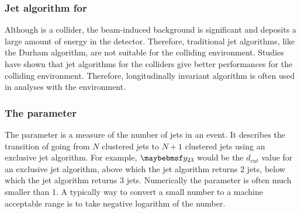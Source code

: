 \subsubsection{Jet algorithm for \CLIC}

Although \CLIC is a \ee collider, the  beam-induced background is significant and deposits a large amount of energy in the detector. Therefore, traditional \ee jet algorithms, like the Durham algorithm, are not suitable for the \CLIC colliding environment. Studies \cite{Linssen:2012hp,LCD-Note-2010-006} have shown that jet algorithms for the \pp colliders give better performances for the \CLIC  colliding environment. Therefore, longitudinally invariant \kt algorithm is often used in analyses with the \CLIC environment.





\subsubsection{The \y{} parameter}
\label{sec:pandoraYparameter}
The \y{} parameter is a measure of the number of jets in an event.  It describes the transition of  going from $N$ clustered jets to $N\!+\!1$ clustered jets using an exclusive jet algorithm. For example, $\y{23}$ would be the $d_{cut}$ value for an exclusive jet algorithm, above which the jet algorithm returns 2 jets, below which the jet algorithm returns 3 jets. Numerically the \y{} parameter is often much smaller than 1. A typically way to convert a small number to a machine acceptable range is to take  negative logarithm of the number.


